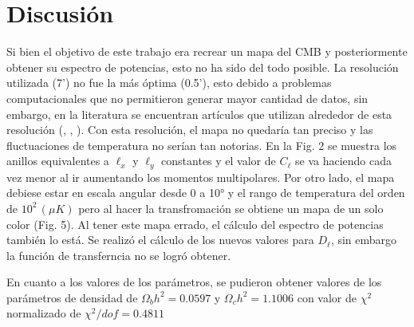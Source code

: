 \documentclass[twocolumn,letterpaper,spanish]{revtex4}
\numberwithin{equation}{section}
\begin{document}
\section{Discusi\'on}\label{discusion}

Si bien el objetivo de este trabajo era recrear un mapa del CMB y posteriormente obtener su espectro de potencias, esto no ha sido del todo posible. La resoluci\'on utilizada (7') no fue la m\'as \'optima (0.5'), esto debido a problemas computacionales que no permitieron generar mayor cantidad de datos, sin embargo, en la literatura se encuentran art\'iculos que utilizan alrededor de esta resoluci\'on (\cite{comp1}, \cite{comp2}, \cite{comp3}). Con esta resoluci\'on, el mapa no quedar\'ia tan preciso y las fluctuaciones de temperatura no ser\'ian tan notorias.
En la Fig. 2 se muestra los anillos equivalentes a $\ell_x$ y $\ell_y$ constantes y el valor de $C_{\ell}$ se va haciendo cada vez menor al ir aumentando los momentos multipolares. Por otro lado, el mapa debiese estar en escala angular desde 0 a 10° y el rango de temperatura del orden de $10^2\,(\mu K)$ pero al hacer la transfromaci\'on se obtiene un mapa de un solo color (Fig. 5). Al tener este mapa errado, el c\'alculo del espectro de potencias tambi\'en lo est\'a.
Se realiz\'o el c\'alculo de los nuevos valores para $D_\ell$, sin embargo la funci\'on de transferncia no se logr\'o obtener.




En cuanto a los valores de los par\'ametros, se pudieron obtener valores de los par\'ametros de densidad de $\Omega_b h^2 = 0.0597$ y $\Omega_c h^2 = 1.1006$ con valor de $\chi^2$ normalizado de $\chi^2/dof = 0.4811$








\end{document}
